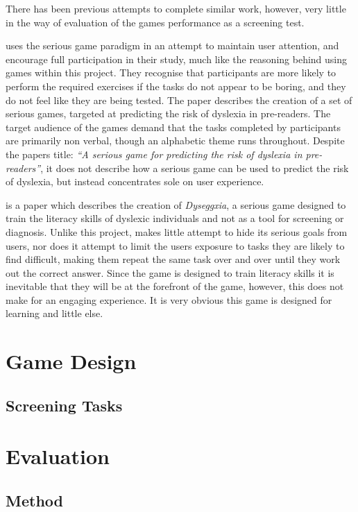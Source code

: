 \documentclass[journal]{IEEEtran}
\begin{document}
There has been previous attempts to complete similar work, however, very little in the way of evaluation of the games performance as a screening test.

\cite{SeriousForPredicting} uses the serious game paradigm in an attempt to maintain user attention, and encourage full participation in their study, much like the reasoning behind using games within this project. They recognise that participants are more likely to perform the required exercises if the tasks do not appear to be boring, and they do not feel like they are being tested. The paper describes the creation of a set of serious games, targeted at predicting the risk of dyslexia in pre-readers. The target audience of the games demand that the tasks completed by participants are primarily non verbal, though an alphabetic theme runs throughout.  Despite the papers title: \emph{``A serious game for predicting the risk of dyslexia in pre-readers''}, it does not describe how a serious game can be used to predict the risk of dyslexia, but instead concentrates sole on user experience.

\cite{Dyseggxia} is a paper which describes the creation of \textit{Dyseggxia}, a serious game designed to train the literacy skills of dyslexic individuals and not as a tool for screening or diagnosis.  Unlike this project, \cite{Dyseggxia} makes little attempt to hide its serious goals from users, nor does it attempt to limit the users exposure to tasks they are likely to find difficult, making them repeat the same task over and over until they work out the correct answer. Since the game is designed to train literacy skills it is inevitable that they will be at the forefront of the game, however, this does not make for an engaging experience. It is very obvious this game is designed for learning and little else. 

\section{Game Design}
\subsection{Screening Tasks}
\section{Evaluation}
\subsection{Method}
\end{document}
